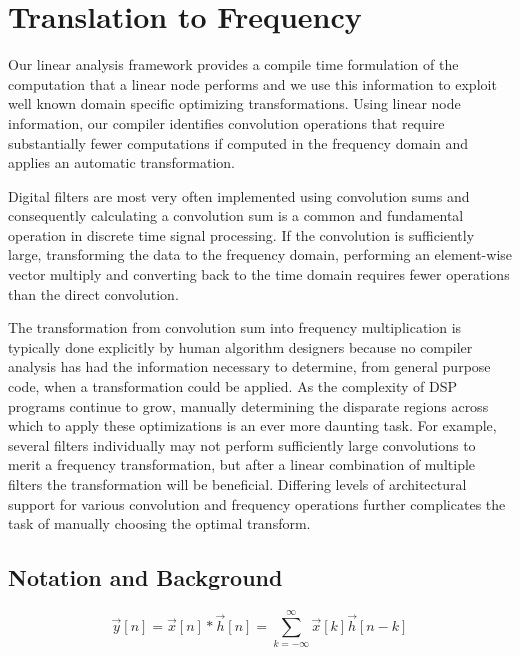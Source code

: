 
\section{Translation to Frequency}
\label{sec:freq}

Our linear analysis framework provides a compile time formulation of
the computation that a linear node performs and we use this
information to exploit well known domain specific optimizing
transformations. Using linear node information, our compiler
identifies convolution operations that require substantially fewer
computations if computed in the frequency domain and applies
an automatic transformation.

Digital filters are most very often implemented using convolution sums
and consequently calculating a convolution sum is a common and fundamental 
operation in discrete time signal processing. If the convolution is
sufficiently large, transforming the data to the frequency domain,
performing an element-wise vector multiply and converting back to the time
domain requires fewer operations than the direct convolution.

The transformation from convolution sum into frequency multiplication
is typically done explicitly by human algorithm designers because no 
compiler analysis has had the information necessary to determine, from 
general purpose code, when a transformation could be applied. 
As the complexity of DSP programs continue to grow, manually 
determining the disparate regions across which 
to apply these optimizations is an ever more daunting task. 
For example, several filters individually may not perform sufficiently large 
convolutions to merit a frequency transformation, but after a linear 
combination of multiple filters the transformation will be beneficial.
Differing levels of architectural support for various convolution and 
frequency operations further complicates the task of manually choosing
the optimal transform.

\subsection{Notation and Background}
\label{sec:method-opt-notation}

\begin{equation}
\label{eqn:conv-sum-again}
\vec{y}[n]=\vec{x}[n]*\vec{h}[n]=\sum_{k=-\infty}^{\infty}\vec{x}[k]\vec{h}[n-k]
\end{equation}

